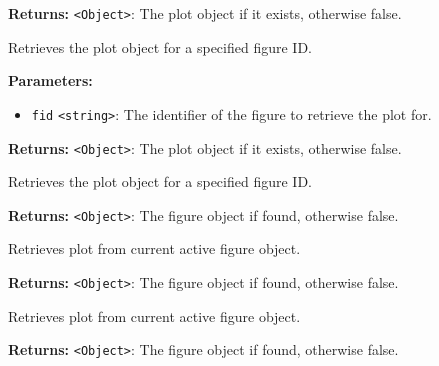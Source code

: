 \documentclass[12pt,a4paper]{article}
\begin{document}
\noindent \textbf{Returns:} \texttt{<Object>}: The plot object if it exists, otherwise \textasciigrave{}false\textasciigrave{}.

\noindent Retrieves the plot object for a specified figure ID.

\vspace{5mm}
\noindent {}


\noindent \textbf{Parameters:}
\begin{itemize}
  \item \texttt{fid} \texttt{<string>}: The identifier of the figure to retrieve the plot for.
\end{itemize}

\noindent \textbf{Returns:} \texttt{<Object>}: The plot object if it exists, otherwise \textasciigrave{}false\textasciigrave{}.

\noindent Retrieves the plot object for a specified figure ID.

\vspace{5mm}
\noindent {}


\noindent \textbf{Returns:} \texttt{<Object>}: The figure object if found, otherwise \textasciigrave{}false\textasciigrave{}.

\noindent Retrieves plot from current active figure object.

\vspace{5mm}
\noindent {}


\noindent \textbf{Returns:} \texttt{<Object>}: The figure object if found, otherwise \textasciigrave{}false\textasciigrave{}.

\noindent Retrieves plot from current active figure object.

\vspace{5mm}
\noindent {}


\noindent \textbf{Returns:} \texttt{<Object>}: The figure object if found, otherwise \textasciigrave{}false\textasciigrave{}.
\end{document}
